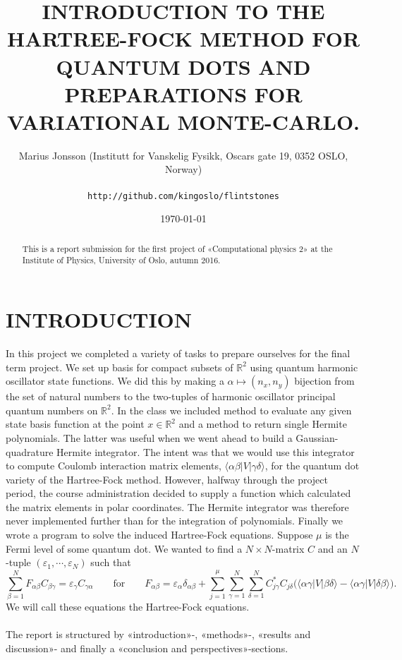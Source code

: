 \documentclass[11pt,english,a4paper]{article}
\author{\normalsize Marius Jonsson (Institutt for Vanskelig Fysikk, Oscars gate 19, 0352 OSLO, Norway) \\\\
\vspace{5px}
\normalsize \texttt{http://github.com/kingoslo/flintstones}}
\title{\bf \uppercase{Introduction to the Hartree-Fock method for quantum dots and preparations for variational monte-carlo.}}
\date{\normalsize \today}
\begin{document}
\maketitle
\begin{abstract} \normalsize This is a report submission for the first project of «Computational physics 2» at the Institute of Physics, University of Oslo, autumn 2016.
\end{abstract}
\lstset{
  xleftmargin=.2\textwidth, xrightmargin=.2\textwidth
}

\section*{\uppercase{Introduction}}
In this project we completed a variety of tasks to prepare ourselves for the final term project. We set up basis for compact subsets of $\mathbb{R}^2$ using quantum harmonic oscillator state functions. We did this by making a $\alpha \mapsto (n_x,n_y)$ bijection from the set of natural numbers to the two-tuples of harmonic oscillator principal quantum numbers on $\mathbb{R}^2$. In the class we included method to evaluate any given state basis function at the point $x \in \mathbb{R}^2$ and a method to return single Hermite polynomials. The latter was useful when we went ahead to build a Gaussian-quadrature Hermite integrator. The intent was that we would use this integrator to compute Coulomb interaction matrix elements,  $\langle \alpha \beta | V | \gamma\delta \rangle$, for the quantum dot variety of the Hartree-Fock method. However, halfway through the project period, the course administration decided to supply a function which calculated the matrix elements in polar coordinates. The Hermite integrator was therefore never implemented further than for the integration of polynomials. Finally we wrote a program to solve the induced Hartree-Fock equations. Suppose $\mu$ is the Fermi level of some quantum dot. We wanted to find a $N \times N$-matrix $C$ and an $N$-tuple $(\varepsilon_1, \cdots, \varepsilon_N)$ such that
\begin{equation}
\sum_{  \beta = 1}^N F_{  \alpha \beta} C_{  \beta \gamma} = \varepsilon_\gamma C_{  \gamma \alpha} \qquad \text{for} \qquad F_{  \alpha \beta} = \varepsilon_{  \alpha} \delta_{  \alpha \beta} + \sum_{  j=1}^\mu \sum_{  \gamma = 1}^N \sum_{  \delta = 1}^N C_{  j \gamma}^* C_{  j \delta} \Big( \langle \alpha \gamma | V | \beta \delta \rangle - \langle \alpha \gamma | V | \delta \beta \rangle \Big).
\label{eq:HF}
\end{equation}
We will call these equations the Hartree-Fock equations.
\\
\\
The report is structured by «introduction»-, «methods»-, «results and discussion»- and finally a «conclusion and perspectives»-sections.
\end{document}
